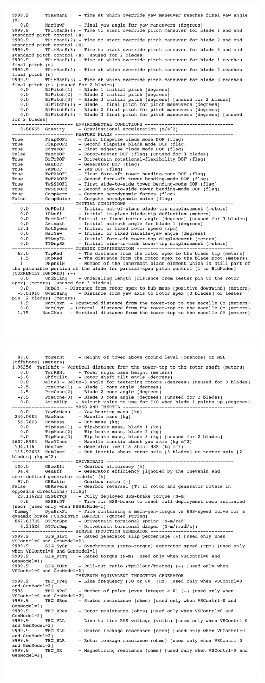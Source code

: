 \noindent
\includegraphics[width=\linewidth]{Figures/AppendixAFigures/primaryP2.pdf}

\noindent
\includegraphics[width=\linewidth]{Figures/AppendixAFigures/primaryP3.pdf}	

